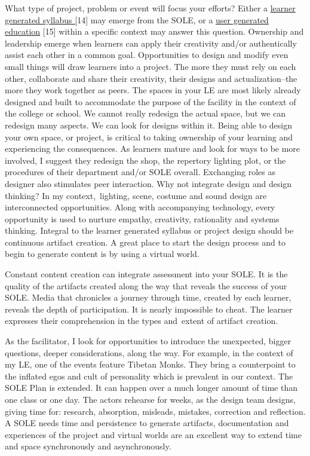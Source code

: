 What type of project, problem or event will focus your efforts? Either a
\href{http://www.theatreprof.com/2011/active-learning-student-generated-syllabus/}{learner
generated syllabus {[}}14{]} may emerge from the SOLE, or a
\href{http://usergeneratededucation.wordpress.com/}{user generated
education} {[}15{]} within a specific context may answer this question.
Ownership and leadership emerge when learners can apply their creativity
and/or authentically assist each other in a common goal. Opportunities
to design and modify even small things will draw learners into a
project. The more they must rely on each other, collaborate and share
their creativity, their designs and actualization--the more they work
together as peers. The spaces in your LE are most likely already
designed and built to accommodate the purpose of the facility in the
context of the college or school. We cannot really redesign the actual
space, but we can redesign many aspects. We can look for designs within
it. Being able to design your own space, or project, is critical to
taking ownership of your learning and experiencing the consequences. As
learners mature and look for ways to be more involved, I suggest they
redesign the shop, the repertory lighting plot, or the procedures of
their department and/or SOLE overall. Exchanging roles as designer also
stimulates peer interaction. Why not integrate design and design
thinking? In my context,~lighting, scene, costume and sound design are
interconnected opportunities. Along with accompanying technology, every
opportunity is used to nurture empathy, creativity, rationality and
systems thinking. Integral to the learner generated syllabus or project
design should be continuous artifact creation. A great place to start
the design process and to begin to generate content is by using a
virtual world.

Constant content creation can integrate assessment into your SOLE. It is
the quality of the artifacts created along the way that reveals the
success of your SOLE. Media that chronicles a journey through time,
created by each learner, reveals the depth of participation. It is
nearly impossible to cheat. The learner expresses their comprehension in
the types and~extent of artifact creation.

As the facilitator, I look for opportunities to introduce the
unexpected, bigger questions, deeper considerations, along the way. For
example, in the context of my LE, one of the events feature Tibetan
Monks. They bring a counterpoint to the inflated egos and cult of
personality which is prevalent in our context. The SOLE Plan is
extended. It can happen over a much longer amount of time than one class
or one day. The actors rehearse for weeks, as the design team designs,
giving time for: research, absorption, misleads, mistakes, correction
and reflection. A SOLE needs time and persistence to generate artifacts,
documentation and experiences of the project and virtual worlds are an
excellent way to extend time and space synchronously and asynchronously.

